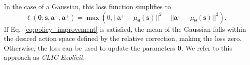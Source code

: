 In the case of a Gaussian, this loss function simplifies to
\begin{equation*}
     \ell(\bm \theta;\bm s, \bm a^{-}, \bm  a^{+}) =  \max (0,  || \bm a^{+} -\mu_{\bm \theta}(\bm s) ||^2 -  || \bm a^{-} - \mu_{\bm \theta}(\bm s) ||^2 ).
\end{equation*}
If Eq.~\eqref{eq:policy_improvement} is satisfied, the mean of the Gaussian falls within the desired action space defined by the relative correction, making the loss zero. Otherwise, the loss can be used to update the parameters $\bm \theta$. We refer to this approach as \emph{CLIC-Explicit}. 